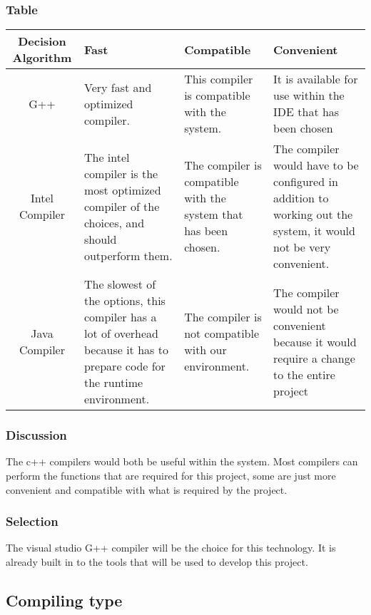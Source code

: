 \documentclass[10pt,letterpaper,onecolumn,draftclsnofoot]{IEEEtran}
\begin{document}
\subsubsection{Table}
\begin{center}
	\begin{tabular}{ ||C|M|M|M|| } 
		\hline
		Decision Algorithm & Fast & Compatible & Convenient \\
		\hline
		G++ & Very fast and optimized compiler. & This compiler is compatible with the system. & It is available for use within the IDE that has been chosen \\ 
		\hline
		Intel Compiler & The intel compiler is the most optimized compiler of the choices, and should outperform them. & The compiler is compatible with the system that has been chosen. & The compiler would have to be configured in addition to working out the system, it would not be very convenient. \\ 
		\hline
		Java Compiler & The slowest of the options, this compiler has a lot of overhead because it has to prepare code for the runtime environment. & The compiler is not compatible with our environment. & The compiler would not be convenient because it would require a change to the entire project \\ 
		\hline
	\end{tabular}
\end{center}
\subsubsection{Discussion}
The c++ compilers would both be useful within the system. Most compilers can perform the functions that are required for this project, some are just more convenient and compatible with what is required by the project.
\subsubsection{Selection}
The visual studio G++ compiler will be the choice for this technology. It is already built in to the tools that will be used to develop this project.

\subsection{Compiling type}
\end{document}
